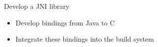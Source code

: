 \setuplabframe
{Develop a JNI library}
{
  \begin{itemize}
  \item Develop bindings from Java to C
  \item Integrate these bindings into the build system
  \end{itemize}
}
